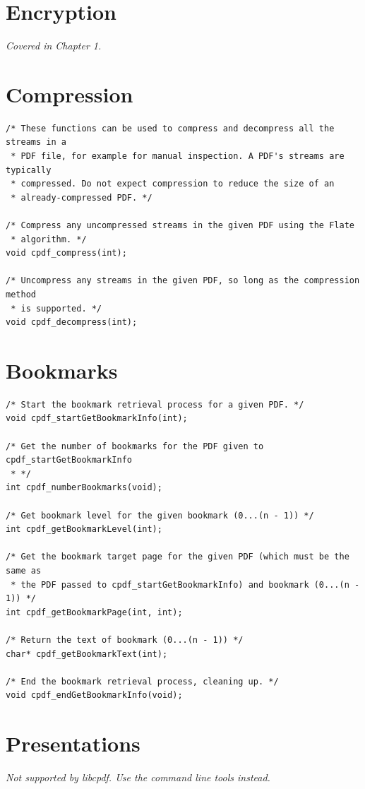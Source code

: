 \documentclass[a4paper]{memoir}
\begin{document}
\chapter{Encryption}
\textit{Covered in Chapter 1.}

\chapter{Compression}
\begin{small}
\begin{lstlisting}
/* These functions can be used to compress and decompress all the streams in a
 * PDF file, for example for manual inspection. A PDF's streams are typically
 * compressed. Do not expect compression to reduce the size of an
 * already-compressed PDF. */

/* Compress any uncompressed streams in the given PDF using the Flate
 * algorithm. */
void cpdf_compress(int);

/* Uncompress any streams in the given PDF, so long as the compression method
 * is supported. */
void cpdf_decompress(int);
\end{lstlisting}
\end{small}

\chapter{Bookmarks}
\begin{small}
\begin{lstlisting}
/* Start the bookmark retrieval process for a given PDF. */
void cpdf_startGetBookmarkInfo(int);

/* Get the number of bookmarks for the PDF given to cpdf_startGetBookmarkInfo
 * */
int cpdf_numberBookmarks(void);

/* Get bookmark level for the given bookmark (0...(n - 1)) */
int cpdf_getBookmarkLevel(int);

/* Get the bookmark target page for the given PDF (which must be the same as
 * the PDF passed to cpdf_startGetBookmarkInfo) and bookmark (0...(n - 1)) */
int cpdf_getBookmarkPage(int, int);

/* Return the text of bookmark (0...(n - 1)) */
char* cpdf_getBookmarkText(int);

/* End the bookmark retrieval process, cleaning up. */
void cpdf_endGetBookmarkInfo(void);
\end{lstlisting}
\end{small}

\chapter{Presentations}
\textit{Not supported by libcpdf. Use the command line tools instead.}
\end{document}
